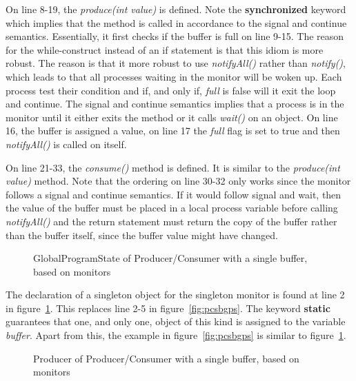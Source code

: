 \documentclass[11pt]{article} %
\begin{document}
On line 8-19, the \emph{produce(int value)} is defined. Note the {\bfseries synchronized} keyword which implies that the method is called in accordance to the signal and continue semantics. Essentially, it first checks if the buffer is full on line 9-15. The reason for the while-construct instead of an if statement is that this idiom is more robust. The reason is that it more robust to use \emph{notifyAll()} rather than \emph{notify()}, which leads to that all processes waiting in the monitor will be woken up. Each process test their condition and if, and only if, \emph{full} is false will it exit the loop and continue. The signal and continue semantics implies that a process is in the monitor until it either exits the method or it calls \emph{wait()} on an object. On line 16, the buffer is assigned a value, on line 17 the \emph{full} flag is set to true and then \emph{notifyAll()} is called on itself. 

On line 21-33, the \emph{consume()} method is defined. It is similar to the \emph{produce(int value)} method. Note that the ordering on line 30-32 only works since the monitor follows a signal and continue semantics. If it would follow signal and wait, then the value of the buffer must be placed in a  local process variable before calling \emph{notifyAll()} and the return statement must return the copy of the buffer rather than the buffer itself, since the buffer value might have changed. 



\begin{figure}[ht]

\caption{GlobalProgramState of Producer/Consumer with a single buffer, based on monitors}
\label{fig:pcsbgps-monitor}
\end{figure}

The declaration of a singleton object for the singleton monitor is found at line 2 in figure~\ref{fig:pcsbgps-monitor}. This replaces line 2-5 in figure~\ref{fig:pcsbgps}. The keyword {\bfseries static} guarantees that one, and only one, object of this kind is assigned to the variable \emph{buffer}. Apart from this, the example in figure~\ref{fig:pcsbgps} is similar to figure~\ref{fig:pcsbgps-monitor}.

\begin{figure}[ht]

\caption{Producer of Producer/Consumer with a single buffer, based on monitors}
\label{fig:pcsbproc-monitor}
\end{figure}
\end{document}
